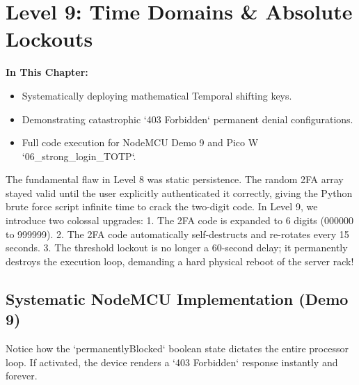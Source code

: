 \chapter{Level 9: Time Domains \& Absolute Lockouts}

\textbf{In This Chapter:}
\begin{itemize}
    \item Systematically deploying mathematical Temporal shifting keys.
    \item Demonstrating catastrophic `403 Forbidden` permanent denial configurations.
    \item Full code execution for NodeMCU Demo 9 and Pico W `06\_strong\_login\_TOTP`.
\end{itemize}

The fundamental flaw in Level 8 was static persistence. The random 2FA array stayed valid until the user explicitly authenticated it correctly, giving the Python brute force script infinite time to crack the two-digit code. In Level 9, we introduce two colossal upgrades:
1. The 2FA code is expanded to 6 digits (000000 to 999999).
2. The 2FA code automatically self-destructs and re-rotates every 15 seconds.
3. The threshold lockout is no longer a 60-second delay; it permanently destroys the execution loop, demanding a hard physical reboot of the server rack!

\section{Systematic NodeMCU Implementation (Demo 9)}
Notice how the `permanentlyBlocked` boolean state dictates the entire processor loop. If activated, the device renders a `403 Forbidden` response instantly and forever.

